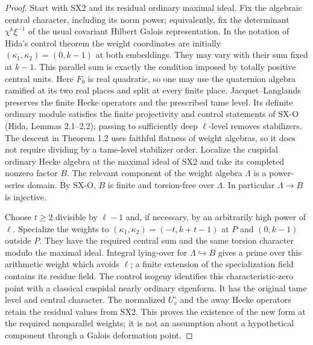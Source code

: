 \begin{proof}
Start with SX2 and its residual ordinary maximal ideal.
Fix the algebraic central character, including its norm power;
equivalently, fix the determinant $\chi^k\xi^{-1}$ of the usual
covariant Hilbert Galois representation.  In the notation of
Hida's control theorem the weight coordinates are initially
$(\kappa_1,\kappa_2)=(0,k-1)$ at both embeddings.  They may vary
with their sum fixed at $k-1$.  This parallel sum is exactly the
condition imposed by totally positive central units.
Here $F_0$ is real quadratic, so one may use the quaternion
algebra ramified at its two real places and split at every finite
place.  Jacquet--Langlands preserves the finite Hecke operators
and the prescribed tame level.  Its definite ordinary module
satisfies the finite projectivity and control statements of
SX-O (Hida, Lemmas 2.1--2.2); passing to sufficiently deep
$\ell$-level removes stabilizers.  The descent in Theorem 1.2
uses faithful flatness of weight algebras, so it does not require
dividing by a tame-level stabilizer order.
Localize the cuspidal
ordinary Hecke algebra at the maximal ideal of SX2 and take its
completed nonzero factor $B$.  The relevant component of the
weight algebra $\Lambda$ is a power-series domain.  By SX-O,
$B$ is finite and torsion-free over $\Lambda$.
In particular $\Lambda\to B$ is injective.

Choose $t\ge2$ divisible by $\ell-1$ and, if necessary, by an
arbitrarily high power of $\ell$.  Specialize the weights to
$(\kappa_1,\kappa_2)=(-t,k+t-1)$ at $P$ and $(0,k-1)$ outside $P$.
They have the required central sum and the same torsion character
modulo the maximal ideal.  Integral lying-over for
$\Lambda\hookrightarrow B$ gives a prime over this arithmetic
weight which avoids $\ell$; a finite extension of the specialization
field contains its residue field.  The control isogeny identifies
this characteristic-zero point with a classical cuspidal nearly
ordinary eigenform.  It has the original tame level and central
character.  The normalized $U_v^\circ$ and the away Hecke
operators retain the residual values from SX2.  This proves the
existence of the new form at the required nonparallel weights;
it is not an assumption about a hypothetical component through a
Galois deformation point.


\end{proof}
